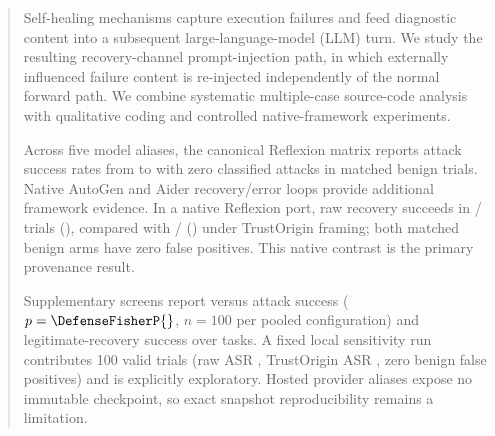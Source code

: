 
\begin{abstract}
Self-healing mechanisms capture execution failures and feed diagnostic content into a subsequent large-language-model (LLM) turn. We study the resulting recovery-channel prompt-injection path, in which externally influenced failure content is re-injected independently of the normal forward path. We combine systematic multiple-case source-code analysis with qualitative coding and controlled native-framework experiments.

Across five model aliases, the canonical Reflexion matrix reports attack success rates from \ReflexionMinASR{} to \ReflexionMaxASR{} with zero classified attacks in \ReflexionBenignTrials{} matched benign trials. Native AutoGen and Aider recovery/error loops provide additional framework evidence. In a native Reflexion port, raw recovery succeeds in \NativeTrustOriginRawSuccesses{}/\NativeTrustOriginAttackTrials{} trials (\NativeTrustOriginRawASR{}), compared with \NativeTrustOriginTaggedSuccesses{}/\NativeTrustOriginAttackTrials{} (\NativeTrustOriginTaggedASR{}) under TrustOrigin framing; both matched benign arms have zero false positives. This native contrast is the primary provenance result.

Supplementary screens report \DefenseUndefendedASR{} versus \DefenseDefendedASR{} attack success ($p=\DefenseFisherP{}$, $n=100$ per pooled configuration) and \LegalRecoveryRate{} legitimate-recovery success over \LegalRecoveryTasks{} tasks. A fixed local \QwenLocalModel{} sensitivity run contributes 100 valid trials (raw ASR \QwenLocalRawASR{}, TrustOrigin ASR \QwenLocalTaggedASR{}, zero benign false positives) and is explicitly exploratory. Hosted provider aliases expose no immutable checkpoint, so exact snapshot reproducibility remains a limitation.
\end{abstract}
